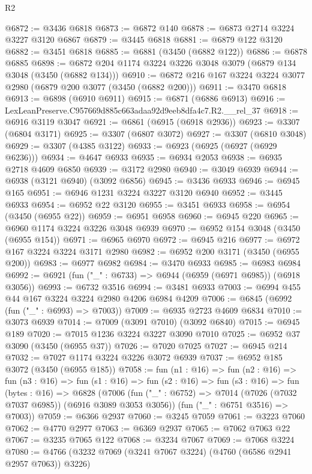 \begin{lexlean}{R2}
\begin{coremodule}
@6872 := @3436 @6818
@6873 := @6872 @140
@6878 := @6873 @2714 @3224 @3227 @3120 @6867
@6879 := @3445 @6818
@6881 := @6879 @122 @3120
@6882 := @3451 @6818
@6885 := @6881 (@3450 (@6882 @122))
@6886 := @6878 @6885
@6898 := @6872 @204 @1174 @3224 @3226 @3048 @3079 (@6879 @134 @3048 (@3450 (@6882 @134)))
@6910 := @6872 @216 @167 @3224 @3224 @3077 @2980 (@6879 @200 @3077 (@3450 (@6882 @200)))
@6911 := @3470 @6818
@6913 := @6898 (@6910 @6911)
@6915 := @6871 (@6886 @6913)
@6916 := LexLeanPreserve.C957669d885c663adaa92d9eeb8dfa4c7.R2.__rel_37
@6918 := @6916 @3119 @3047
@6921 := @6861 (@6915 (@6918 @2936))
@6923 := @3307 (@6804 @3171)
@6925 := @3307 (@6807 @3072)
@6927 := @3307 (@6810 @3048)
@6929 := @3307 (@4385 @3122)
@6933 := @6923 (@6925 (@6927 (@6929 @6236)))
@6934 := @4647 @6933
@6935 := @6934 @2053
@6938 := @6935 @2718 @4609 @6850
@6939 := @3172 @2980
@6940 := @3049 @6939
@6944 := @6938 (@3121 @6940) (@3092 @6856)
@6945 := @3436 @6933
@6946 := @6945 @165
@6951 := @6946 @1231 @3224 @3227 @3120 @6940
@6952 := @3445 @6933
@6954 := @6952 @22 @3120
@6955 := @3451 @6933
@6958 := @6954 (@3450 (@6955 @22))
@6959 := @6951 @6958
@6960 := @6945 @220
@6965 := @6960 @1174 @3224 @3226 @3048 @6939
@6970 := @6952 @154 @3048 (@3450 (@6955 @154))
@6971 := @6965 @6970
@6972 := @6945 @216
@6977 := @6972 @167 @3224 @3224 @3171 @2980
@6982 := @6952 @200 @3171 (@3450 (@6955 @200))
@6983 := @6977 @6982
@6984 := @3470 @6933
@6985 := @6983 @6984
@6992 := @6921 (fun ("_" : @6733) => @6944 (@6959 (@6971 @6985)) (@6918 @3056))
@6993 := @6732 @3516
@6994 := @3481 @6933
@7003 := @6994 @455 @44 @167 @3224 @3224 @2980 @4206 @6984 @4209
@7006 := @6845 (@6992 (fun ("_" : @6993) => @7003))
@7009 := @6935 @2723 @4609 @6834
@7010 := @3073 @6939
@7014 := @7009 (@3091 @7010) (@3092 @6840)
@7015 := @6945 @189
@7020 := @7015 @1236 @3224 @3227 @3090 @7010
@7025 := @6952 @37 @3090 (@3450 (@6955 @37))
@7026 := @7020 @7025
@7027 := @6945 @214
@7032 := @7027 @1174 @3224 @3226 @3072 @6939
@7037 := @6952 @185 @3072 (@3450 (@6955 @185))
@7058 := fun (n1 : @16) =>
  fun (n2 : @16) =>
  fun (n3 : @16) =>
  fun (s1 : @16) =>
  fun (s2 : @16) =>
  fun (s3 : @16) =>
  fun (bytes : @16) =>
  @6828
    (@7006
      (fun ("_" : @6752) => @7014 (@7026 (@7032 @7037 @6985)) (@6916 @3089 @3053 @3056))
      (fun ("_" : @6751 @3516) => @7003))
@7059 := @6366 @2937
@7060 := @3245 @7059
@7061 := @3223 @7060
@7062 := @4770 @2977
@7063 := @6369 @2937
@7065 := @7062 @7063 @22
@7067 := @3235 @7065 @122
@7068 := @3234 @7067
@7069 := @7068 @3224
@7080 := @4766 (@3232 @7069 (@3241 @7067 @3224) (@4760 (@6586 @2941 @2957 @7063)) @3226)

\end{coremodule}
\end{lexlean}
